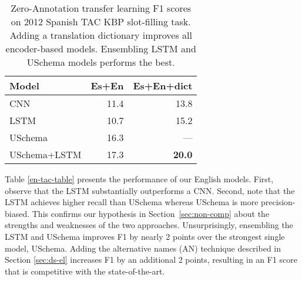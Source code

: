 \begin{table}[h!]

\begin{center}
\caption{Zero-Annotation transfer learning F1 scores on 2012 Spanish TAC KBP slot-filling task. Adding a translation dictionary improves all encoder-based models. Ensembling LSTM and USchema models performs the best. \label{es-tac-table}}
\begin{tabular}{|lrr|}
\hline
\bf Model & \bf Es+En & \bf Es+En+dict  \\
\hline\hline
CNN 		                    & 11.4     & 13.8	\\
LSTM 	                        & 10.7     & 15.2   \\
USchema                         & 16.3     & --- \\
\hline
USchema+LSTM                    & 17.3     & \bf 20.0 \\
\hline
\end{tabular}
\end{center}
\end{table}




Table \ref{en-tac-table} presents the performance of our English models. First, observe that the LSTM substantially outperforms a CNN. Second, note that the LSTM achieves higher recall than USchema whereas USchema is more precision-biased. This confirms our hypothesis in Section~\ref{sec:non-comp} about the strengths and weaknesses of the two approaches. 
Unsurprisingly, ensembling the LSTM and USchema improves F1 by nearly 2 points over the strongest single model, USchema. Adding the alternative names (AN) technique described in Section \ref{sec:ds-el} increases F1 by an additional 2 points, resulting in an F1 score that is competitive with the state-of-the-art.

